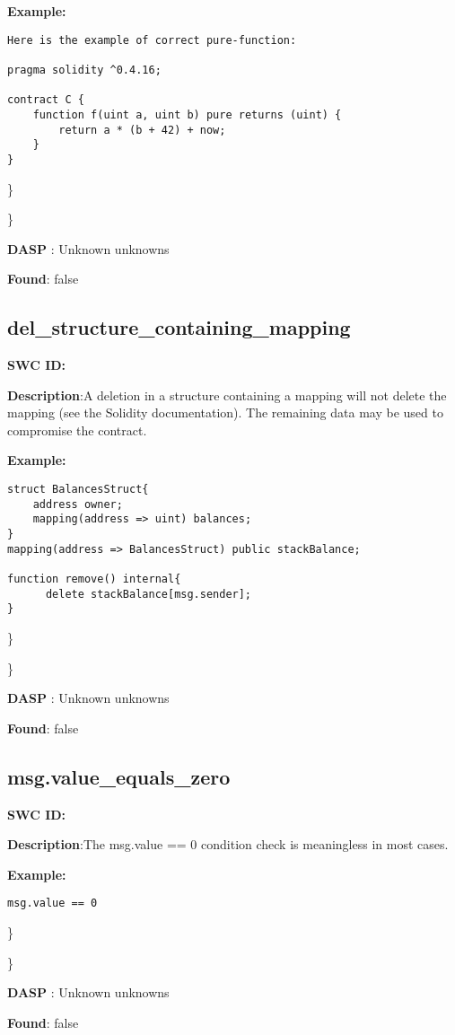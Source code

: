 \documentclass{article}
\begin{document}
\textbf{Example:} 
\begin{verbatim}
Here is the example of correct pure-function:

pragma solidity ^0.4.16;

contract C {
    function f(uint a, uint b) pure returns (uint) {
        return a * (b + 42) + now;
    }
}

\end{verbatim}\} 

\} 

\textbf{DASP} : Unknown unknowns

\textbf{Found}: false

\subsection{del\_structure\_containing\_mapping} 
\textbf{SWC \textunderscore ID:} 

\textbf{Description}:A deletion in a structure containing a mapping will not delete the mapping (see the Solidity documentation). The remaining data may be used to compromise the contract.


\textbf{Example:} 
\begin{verbatim}
struct BalancesStruct{
    address owner;
    mapping(address => uint) balances;
}
mapping(address => BalancesStruct) public stackBalance;

function remove() internal{
      delete stackBalance[msg.sender];
}

\end{verbatim}\} 

\} 

\textbf{DASP} : Unknown unknowns

\textbf{Found}: false

\subsection{msg.value\_equals\_zero} 
\textbf{SWC \textunderscore ID:} 

\textbf{Description}:The msg.value == 0 condition check is meaningless in most cases.


\textbf{Example:} 
\begin{verbatim}
msg.value == 0

\end{verbatim}\} 

\} 

\textbf{DASP} : Unknown unknowns

\textbf{Found}: false
\end{document}
